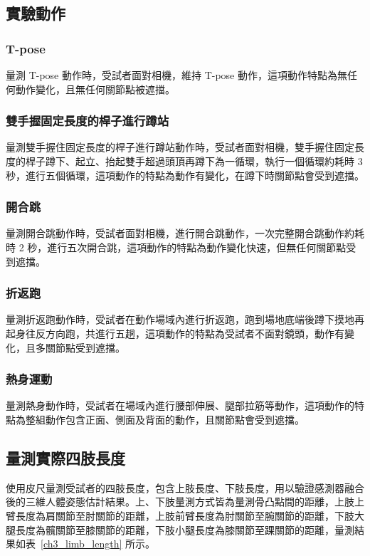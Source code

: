 \subsection{實驗動作}
\subsubsection*{T-pose}
量測 T-pose 動作時，受試者面對相機，維持 T-pose 動作，這項動作特點為無任何動作變化，且無任何關節點被遮擋。
    
\subsubsection*{雙手握固定長度的桿子進行蹲站}
量測雙手握住固定長度的桿子進行蹲站動作時，受試者面對相機，雙手握住固定長度的桿子蹲下、起立、抬起雙手超過頭頂再蹲下為一循環，執行一個循環約耗時 3 秒，進行五個循環，這項動作的特點為動作有變化，在蹲下時關節點會受到遮擋。
    
\subsubsection*{開合跳}
量測開合跳動作時，受試者面對相機，進行開合跳動作，一次完整開合跳動作約耗時 2 秒，進行五次開合跳，這項動作的特點為動作變化快速，但無任何關節點受到遮擋。
    
\subsubsection*{折返跑}
量測折返跑動作時，受試者在動作場域內進行折返跑，跑到場地底端後蹲下摸地再起身往反方向跑，共進行五趟，這項動作的特點為受試者不面對鏡頭，動作有變化，且多關節點受到遮擋。
    
\subsubsection*{熱身運動}
量測熱身動作時，受試者在場域內進行腰部伸展、腿部拉筋等動作，這項動作的特點為整組動作包含正面、側面及背面的動作，且關節點會受到遮擋。
    

\subsection{量測實際四肢長度}
使用皮尺量測受試者的四肢長度，包含上肢長度、下肢長度，用以驗證感測器融合後的三維人體姿態估計結果。上、下肢量測方式皆為量測骨凸點間的距離，上肢上臂長度為肩關節至肘關節的距離，上肢前臂長度為肘關節至腕關節的距離，下肢大腿長度為髖關節至膝關節的距離，下肢小腿長度為膝關節至踝關節的距離，量測結果如表~\ref{ch3_limb_length} 所示。

